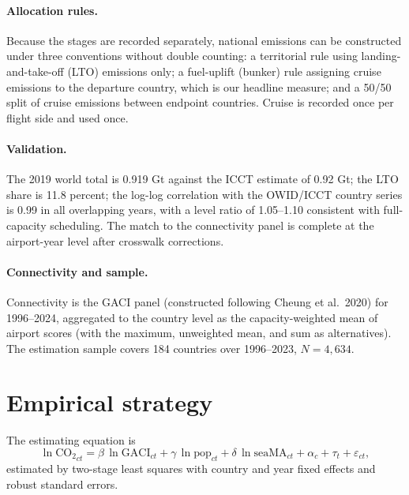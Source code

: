 \documentclass[12pt]{article}
\begin{document}
\paragraph{Allocation rules.} Because the stages are recorded separately,
national emissions can be constructed under three conventions without double
counting: a territorial rule using landing-and-take-off (LTO) emissions
only; a fuel-uplift (bunker) rule assigning cruise emissions to the
departure country, which is our headline measure; and a 50/50 split of
cruise emissions between endpoint countries. Cruise is recorded once per
flight side and used once.

\paragraph{Validation.} The 2019 world total is 0.919 Gt against the ICCT
estimate of 0.92 Gt; the LTO share is 11.8 percent; the log-log correlation
with the OWID/ICCT country series is 0.99 in all overlapping years, with a
level ratio of 1.05--1.10 consistent with full-capacity scheduling. The
match to the connectivity panel is complete at the airport-year level after
crosswalk corrections.

\paragraph{Connectivity and sample.} Connectivity is the GACI panel
(constructed following Cheung et al.\ 2020) for 1996--2024, aggregated to
the country level as the capacity-weighted mean of airport scores (with the
maximum, unweighted mean, and sum as alternatives). The estimation sample
covers 184 countries over 1996--2023, $N = 4{,}634$.

\section{Empirical strategy}
The estimating equation is
\begin{equation}
\ln \mathrm{CO_2}_{ct} = \beta \,\ln \mathrm{GACI}_{ct}
 + \gamma \,\ln \mathrm{pop}_{ct} + \delta \,\ln \mathrm{seaMA}_{ct}
 + \alpha_c + \tau_t + \varepsilon_{ct},
\label{eq:main}
\end{equation}
estimated by two-stage least squares with country and year fixed effects and
robust standard errors.
\end{document}
